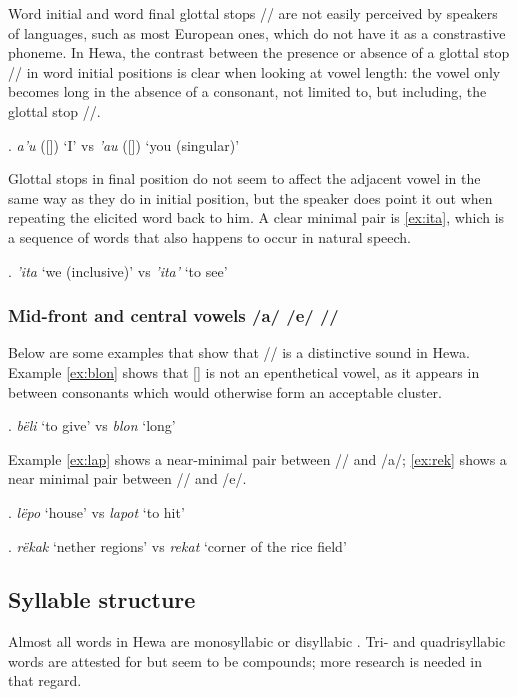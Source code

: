 \documentclass[subpreambles=true]{standalone}
\begin{document}
Word initial and word final glottal stops /\textglotstop / are not easily perceived by speakers of languages, such as most European ones, which do not have it as a constrastive phoneme. In Hewa, the contrast between the presence or absence of a glottal stop /\textglotstop / in word initial positions is clear when looking at vowel length: the vowel only becomes long in the absence of a consonant, not limited to, but including, the glottal stop /\textglotstop /.

\ex. \textit{a'u} ([]) `I' vs \textit{'au} ([]) `you (singular)'

Glottal stops in final position do not seem to affect the adjacent vowel in the same way as they do in initial position, but the speaker does point it out when repeating the elicited word back to him. A clear minimal pair is \ref{ex:ita}, which is a sequence of words that also happens to occur in natural speech.

\ex. \label{ex:ita} \textit{'ita} `we (inclusive)' vs \textit{'ita'} `to see'

\subsubsection{Mid-front and central vowels /a/ /e/ /\textschwa/}

Below are some examples that show that /\textschwa / is a distinctive sound in Hewa. Example \ref{ex:blon} shows that [\textschwa] is not an epenthetical vowel, as it appears in between consonants which would otherwise form an acceptable cluster.

\ex. \label{ex:blon} \textit{bëli} `to give' vs \textit{blon} `long'

Example \ref{ex:lap} shows a near-minimal pair between /\textschwa / and /a/; \ref{ex:rek} shows a near minimal pair between /\textschwa / and /e/.

\ex. \label{ex:lap} \textit{lëpo} `house' vs \textit{lapot} `to hit'

\ex. \label{ex:rek} \textit{rëkak} `nether regions' vs \textit{rekat} `corner of the rice field'

\subsection{Syllable structure}\label{sec:syl}


Almost all words in Hewa are monosyllabic or disyllabic . Tri- and quadrisyllabic words are attested for but seem to be compounds; more research is needed in that regard. 
\end{document}
